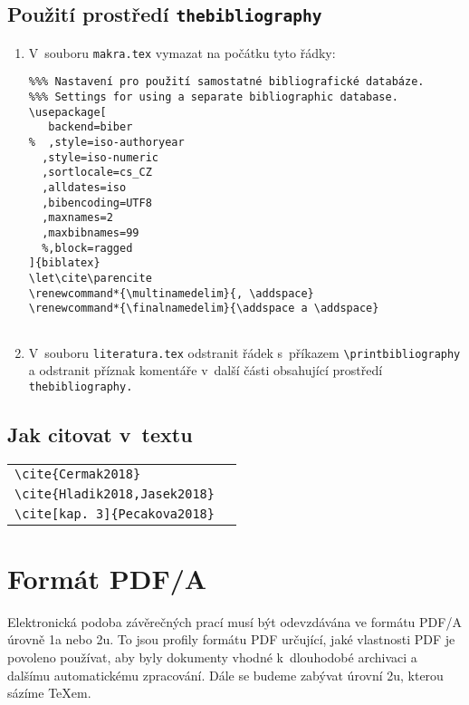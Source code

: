 \section{Použití prostředí \texttt{thebibliography}}
\begin{enumerate}
\item V~souboru \texttt{makra.tex} vymazat na počátku tyto řádky:
\begin{verbatim}
%%% Nastavení pro použití samostatné bibliografické databáze.
%%% Settings for using a separate bibliographic database.
\usepackage[
   backend=biber
%  ,style=iso-authoryear
  ,style=iso-numeric
  ,sortlocale=cs_CZ
  ,alldates=iso
  ,bibencoding=UTF8
  ,maxnames=2
  ,maxbibnames=99
  %,block=ragged
]{biblatex}
\let\cite\parencite
\renewcommand*{\multinamedelim}{, \addspace}
\renewcommand*{\finalnamedelim}{\addspace a \addspace}


\end{verbatim}
\item V~souboru \texttt{literatura.tex} odstranit řádek s~příkazem \verb'\printbibliography' a odstranit příznak komentáře v~další části obsahující prostředí \texttt{thebibliography.}
\end{enumerate}


\section{Jak citovat v~textu}
\begin{center}
\begin{tabular}{l@{~~$\longrightarrow$~~}l}
\verb|\cite{Cermak2018}|&\cite{Cermak2018}\\
\verb|\cite{Hladik2018,Jasek2018}|&\cite{Hladik2018,Jasek2018}\\
\verb|\cite[kap. 3]{Pecakova2018}|&\cite[kap. 3]{Pecakova2018}\\
\end{tabular}
\end{center}


\chapter{Formát PDF/A}

Elektronická podoba závěrečných
prací musí být odevzdávána ve formátu PDF/A úrovně 1a nebo 2u. To jsou
profily formátu PDF určující, jaké vlastnosti PDF je povoleno používat,
aby byly dokumenty vhodné k~dlouhodobé archivaci a dalšímu automatickému
zpracování. Dále se budeme zabývat úrovní 2u, kterou sázíme \TeX{}em.

